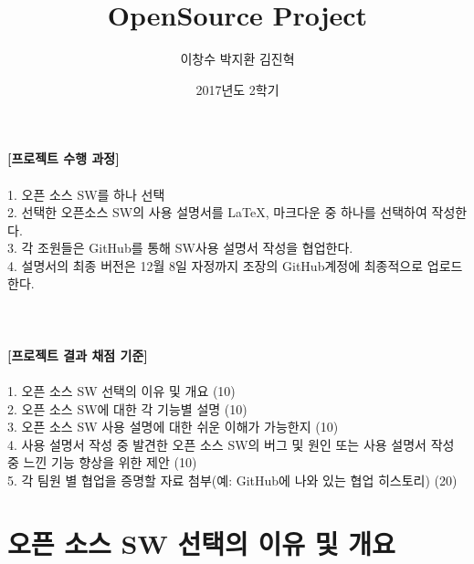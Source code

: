 \documentclass{report}
\title{OpenSource Project}
\author{이창수 박지환 김진혁}
\date{2017년도 2학기}
\newcommand{\note}[1]{{\Large\bf#1}}%
\newcommand{\bluenote}[1]{{\Large\color{blue}#1}}%
\begin{document}
    
    

    \maketitle%

    \note { [프로젝트 수행 과정]}
    \\
    \\
    \bluenote 1. 오픈 소스 SW를 하나 선택
    \\
    \bluenote 2. 선택한 오픈소스 SW의 사용 설명서를 LaTeX, 마크다운 중 하나를 선택하여 작성한다.
    \\
    \bluenote 3. 각 조원들은 GitHub를 통해 SW사용 설명서 작성을 협업한다.
    \\
    \bluenote 4. 설명서의 최종 버전은  12월 8일 자정까지 조장의 GitHub계정에 최종적으로 업로드한다.
    \\
    \\
    \\
    \\
    
    \note {[프로젝트 결과 채점 기준]}
    \\
    \\
    \bluenote 1. 오픈 소스 SW 선택의 이유 및 개요 (10)
    \\
    \bluenote 2. 오픈 소스 SW에 대한 각 기능별 설명 (10)
    \\
    \bluenote 3. 오픈 소스 SW 사용 설명에 대한 쉬운 이해가 가능한지 (10)
    \\
    \bluenote 4. 사용 설명서 작성 중 발견한 오픈 소스 SW의 버그 및 원인 또는 사용 설명서 작성 중 느낀 기능 향상을 위한 제안 (10)
    \\
    \bluenote 5. 각 팀원 별 협업을 증명할 자료 첨부(예: GitHub에 나와 있는 협업 히스토리) (20) 
    \\
    



    

    
    \tableofcontents{}
 




    
    
    
    \chapter {오픈 소스 SW 선택의 이유 및 개요}
\end{document}
